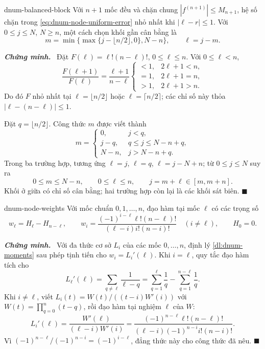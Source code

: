 \documentclass[12pt,a4paper,oneside]{book}
\numberwithin{algorithm}{chapter}
\theoremstyle{definition}
\newenvironment{chungminh}{\par\medskip\noindent\textbf{\textit{\color{mainblue}Chứng minh.}}\ }{\hfill$\blacksquare$\par\medskip}
\begin{document}
\begin{menhde}{}{dnum-balanced-block}
Với $n+1$ mốc đều và chặn chung $|f^{(n+1)}|\leq M_{n+1}$, hệ số chặn trong \eqref{eq:dnum-node-uniform-error} nhỏ nhất khi $|\ell-r|\leq1$. Với $0\leq j\leq N$, $N\geq n$, một cách chọn khối gần cân bằng là
\[
 m=\min\{\max\{j-\lfloor n/2\rfloor,0\},N-n\},\qquad \ell=j-m.
\]
\end{menhde}
\begin{chungminh}
Đặt $F(\ell)=\ell!(n-\ell)!$, $0\leq\ell\leq n$. Với $0\leq\ell<n$,
\[
 \frac{F(\ell+1)}{F(\ell)}=\frac{\ell+1}{n-\ell}
 \begin{cases}<1,&2\ell+1<n,\\=1,&2\ell+1=n,\\>1,&2\ell+1>n.\end{cases}
\]
Do đó $F$ nhỏ nhất tại $\ell=\lfloor n/2\rfloor$ hoặc $\ell=\lceil n/2\rceil$; các chỉ số này thỏa $|\ell-(n-\ell)|\leq1$.

Đặt $q=\lfloor n/2\rfloor$. Công thức $m$ được viết thành
\[
 m=\begin{cases}0,&j<q,\\j-q,&q\leq j\leq N-n+q,\\N-n,&j>N-n+q.\end{cases}
\]
Trong ba trường hợp, tương ứng $\ell=j$, $\ell=q$, $\ell=j-N+n$; từ $0\leq j\leq N$ suy ra
\[
 0\leq m\leq N-n,\qquad0\leq\ell\leq n,\qquad j=m+\ell\in[m,m+n].
\]
Khối ở giữa có chỉ số cân bằng; hai trường hợp còn lại là các khối sát biên.
\end{chungminh}

\begin{menhde}{}{dnum-node-weights}
Với mốc chuẩn $0,1,\ldots,n$, đạo hàm tại mốc $\ell$ có các trọng số
\[
 w_\ell=H_\ell-H_{n-\ell},\qquad
 w_i=\frac{(-1)^{i-\ell}\ell!(n-\ell)!}{(\ell-i)i!(n-i)!}\quad(i\ne\ell),\qquad H_0=0.
\]
\end{menhde}
\begin{chungminh}
Với đa thức cơ sở $L_i$ của các mốc $0,\ldots,n$, định lý \ref{dl:dnum-moments} sau phép tịnh tiến cho $w_i=L_i'(\ell)$. Khi $i=\ell$, quy tắc đạo hàm tích cho
\[
 L_\ell'(\ell)=\sum_{q\ne\ell}\frac1{\ell-q}
 =\sum_{q=1}^\ell\frac1q-\sum_{q=1}^{n-\ell}\frac1q.
\]
Khi $i\ne\ell$, viết $L_i(t)=W(t)/((t-i)W'(i))$ với $W(t)=\prod_{q=0}^n(t-q)$, rồi đạo hàm tại nghiệm $\ell$ của $W$:
\[
 L_i'(\ell)=\frac{W'(\ell)}{(\ell-i)W'(i)}
 =\frac{(-1)^{n-\ell}\ell!(n-\ell)!}{(\ell-i)(-1)^{n-i}i!(n-i)!}.
\]
Vì $(-1)^{n-\ell}/(-1)^{n-i}=(-1)^{i-\ell}$, đẳng thức này cho công thức đã nêu.
\end{chungminh}
\end{document}
